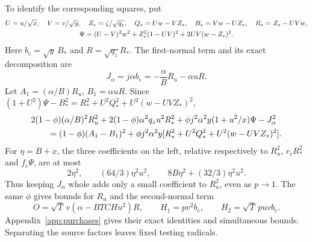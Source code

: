 \documentclass[10pt]{article}
\newcommand{\bc}{b_{\mathrm c}}
\newcommand{\Zc}{Z_*}
\newcommand{\Qh}{Q_*}
\newcommand{\Rh}{R_*}
\newcommand{\Bh}{B_*}
\newcommand{\Ps}{\Psi}
\begin{document}
To identify the corresponding squares, put
\begin{gather}
 U=u/\sqrt x,\quad V=v/\sqrt y,\quad \Zc=\zeta/\sqrt{q_z},\quad
 \Qh=Uw-V\Zc,\quad \Bh=Vw-U\Zc,\quad\Rh=\Zc-UVw,\notag\\
 \Ps=(U-V)^2w^2+\Zc^2(1-UV)^2+2UV(w-\Zc)^2 .
 \label{eq:circuit}
\end{gather}
Here $\bc=\sqrt y\,\Bh$ and $R=\sqrt{q_z}\Rh$.
The first-normal term and its exact decomposition are
\begin{equation}
 J_\alpha=j\alpha\bc=-\frac{\alpha}{B}R_u-\alpha uR .
 \label{eq:J}
\end{equation}
Let $A_1=(\alpha/B)R_u$, $B_1=\alpha uR$. Since
$(1+U^2)\Ps-\Bh^2=\Rh^2+U^2\Qh^2+U^2(w-UV\Zc)^2$,
\begin{align}
 &2(1-\phi)(\alpha/B)^2R_u^2
 +2(1-\phi)\alpha^2q_zu^2\Rh^2
 +\phi j^2\alpha^2y(1+u^2/x)\Ps-J_\alpha^2 \notag\\
 &\qquad=(1-\phi)(A_1-B_1)^2
 +\phi j^2\alpha^2y[\Rh^2+U^2\Qh^2+U^2(w-UV\Zc)^2].
 \label{eq:Jpurchase}
\end{align}
For $\eta=B+x$, the three coefficients on the left, relative respectively to
$R_u^2$, $r_c\Rh^2$ and $f_c\Ps$, are at most
\[
 2\eta^2,\qquad (64/3)\eta^2u^2,\qquad
 8B\eta^2+(32/3)\eta^2u^2 .
\]
Thus keeping $J_\alpha$ whole adds only a small coefficient to
$R_u^2$, even as $p\to1$. The same $\phi$ gives bounds for $R_u$ and the second-normal
term
\begin{equation}
 O=\sqrt T\,v(\alpha-BTCHu^2)R,\qquad
 H_1=pv^2\bc,\qquad H_2=\sqrt T\,puv\bc .
 \label{eq:helpers}
\end{equation}
Appendix~\ref{app:purchases} gives their exact identities and simultaneous
bounds. Separating the source factors leaves fixed testing radicals.
\end{document}

